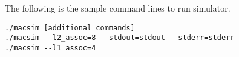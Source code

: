 The following is the sample command lines to run \SIM simulator.

\smallskip
\begin{lstlisting}
./macsim [additional commands]
./macsim --l2_assoc=8 --stdout=stdout --stderr=stderr
./macsim --l1_assoc=4 
\end{lstlisting}
\smallskip




